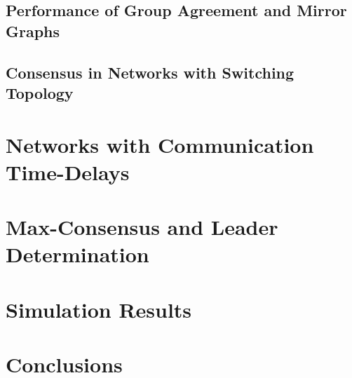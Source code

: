 \documentclass{article}
\begin{document}
\subsection{Performance of Group Agreement and Mirror Graphs}

\subsection{Consensus in Networks with Switching Topology}

\section{Networks with Communication Time-Delays}

\section{Max-Consensus and Leader Determination}

\section{Simulation Results}

\section{Conclusions}
\end{document}

